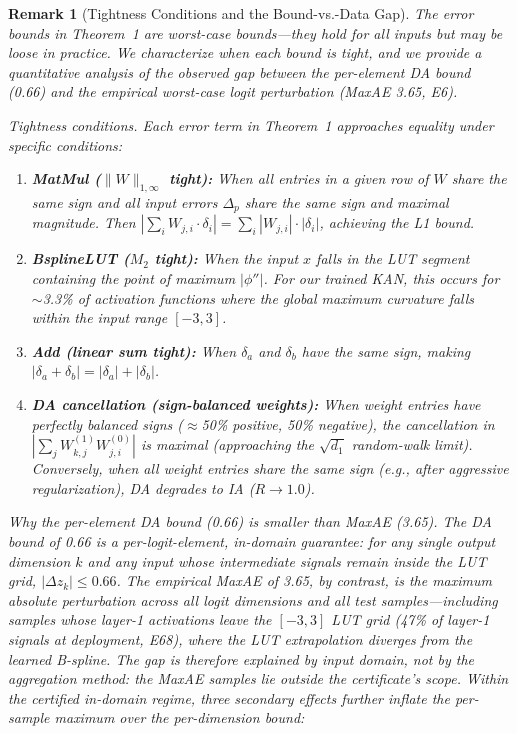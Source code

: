 \documentclass[journal,onecolumn]{IEEEtran}
\newtheorem{remark}{Remark}
\begin{document}
\begin{remark}[Tightness Conditions and the Bound-vs.-Data Gap]
\label{rem:tightness}
The error bounds in Theorem~1 are \textit{worst-case} bounds---they hold for
all inputs but may be loose in practice. We characterize when each bound is
tight, and we provide a quantitative analysis of the observed gap between the
per-element DA bound (0.66) and the empirical worst-case logit perturbation
(MaxAE 3.65, E6).

\vspace{2pt}
\noindent\textit{Tightness conditions.} Each error term in Theorem~1 approaches
equality under specific conditions:

\begin{enumerate}
    \item \textbf{MatMul ($\|W\|_{1,\infty}$ tight):} When all entries in a
         given row of $W$ share the same sign \textit{and} all input errors
          $\Delta_p$ share the same sign and maximal magnitude. Then
          $|\sum_i W_{j,i} \cdot \delta_i| = \sum_i |W_{j,i}| \cdot |\delta_i|$,
         achieving the L1 bound.
    \item \textbf{BsplineLUT ($M_2$ tight):} When the input $x$ falls in the LUT
         segment containing the point of maximum $|\phi''|$. For our trained
         KAN, this occurs for $\sim$3.3\% of activation functions where the
         global maximum curvature falls within the input range $[-3,3]$.
    \item \textbf{Add (linear sum tight):} When $\delta_a$ and $\delta_b$ have
         the same sign, making $|\delta_a + \delta_b| = |\delta_a| + |\delta_b|$.
    \item \textbf{DA cancellation (sign-balanced weights):} When weight entries
         have perfectly balanced signs ($\approx$50\% positive, 50\% negative),
         the cancellation in $|\sum_j W^{(1)}_{k,j} W^{(0)}_{j,i}|$ is maximal
          (approaching the $\sqrt{d_1}$ random-walk limit). Conversely, when all
         weight entries share the same sign (e.g., after aggressive
         regularization), DA degrades to IA ($R \to 1.0$).
\end{enumerate}

\vspace{2pt}
\noindent\textit{Why the per-element DA bound (0.66) is smaller than MaxAE (3.65).}
The DA bound of 0.66 is a per-logit-element, \emph{in-domain} guarantee:
for any single output dimension $k$ and any input whose intermediate
signals remain inside the LUT grid, $|\Delta z_k| \leq 0.66$. The empirical
MaxAE of 3.65, by contrast, is the maximum absolute perturbation across all
logit dimensions and all test samples---including samples whose layer-1
activations leave the $[-3,3]$ LUT grid (47\% of layer-1 signals at
deployment, E68), where the LUT extrapolation diverges from the learned
B-spline. The gap is therefore explained by input \emph{domain}, not by
the aggregation method: the MaxAE samples lie outside the certificate's
scope. Within the certified in-domain regime, three secondary effects
further inflate the per-sample maximum over the per-dimension bound:


\end{remark}
\end{document}
